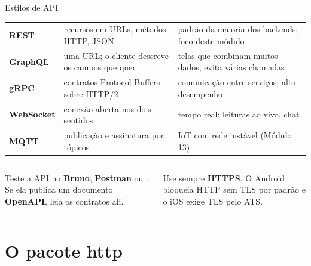 \documentclass[aspectratio=169,10pt]{beamer}
\begin{document}
\begin{frame}{Estilos de API}
  \footnotesize
  \begin{tabularx}{\textwidth}{@{}l L L@{}}
    \toprule
     &  &  \\
    \midrule
    \textbf{REST} & recursos em URLs, métodos HTTP, JSON & padrão da maioria dos backends; foco deste módulo \\
    \textbf{GraphQL} & uma URL; o cliente descreve os campos que quer & telas que combinam muitos dados; evita várias chamadas \\
    \textbf{gRPC} & contratos Protocol Buffers sobre HTTP/2 & comunicação entre serviços; alto desempenho \\
    \textbf{WebSocket} & conexão aberta nos dois sentidos & tempo real: leituras ao vivo, chat \\
    \textbf{MQTT} & publicação e assinatura por tópicos & IoT com rede instável (Módulo 13) \\
    \bottomrule
  \end{tabularx}
  \vspace{4pt}
  \begin{columns}[T]
    \begin{column}{0.47\textwidth}
      \begin{dica}
        Teste a API no \textbf{Bruno}, \textbf{Postman} ou . Se ela publica um documento \textbf{OpenAPI}, leia os contratos ali.
      \end{dica}
    \end{column}
    \begin{column}{0.47\textwidth}
      \begin{atencao}
        Use sempre \textbf{HTTPS}. O Android bloqueia HTTP sem TLS por padrão e o iOS exige TLS pelo ATS.
      \end{atencao}
    \end{column}
  \end{columns}
\end{frame}

\section{O pacote http}
\end{document}
